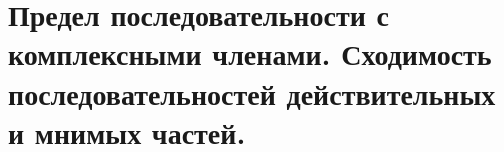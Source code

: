 {
	\section{Предел последовательности с комплексными членами. Сходимость последовательностей действительных и
	мнимых частей.}

	\newpage
}